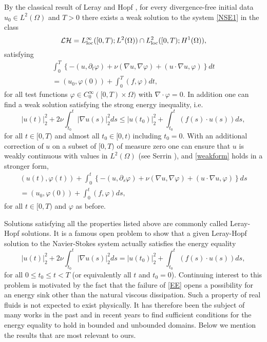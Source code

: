 \documentclass[12pt]{amsart}
\theoremstyle{plain}
\theoremstyle{definition}
\theoremstyle{remark}
\begin{document}
By the classical result of Leray \cite{Leray} and Hopf \cite{Hopf},
for every divergence-free initial data $u_0 \in L^2(\Omega)$ and
$T>0$ there exists a weak solution to the system \eqref{NSE1} in the
class
\begin{equation}
{\mathcal{LH}} = L^\infty_{\rm loc}([0,T);L^2(\Omega)) \cap L^2_{\rm loc}([0,T);H^1(\Omega)),
\end{equation}
satisfying
\begin{multline}\label{weakform}
 \int_0^T \left\{ - (u,{\partial}_t {\varphi}) + \nu ({\nabla} u,{\nabla} {\varphi}) + (u\cdot {\nabla} u, {\varphi}) \right\} dt\\ = (u_0,{\varphi}(0)) + \int_0^T (f,{\varphi})dt,
\end{multline}
for all test functions ${\varphi} \in C_0^\infty([0,T)\times \Omega)$ with ${\nabla} \cdot {\varphi} = 0$.
In addition one can find a weak solution satisfying the strong energy inequality, i.e.
\begin{equation}\label{SEI}
|u(t)|_2^2 + 2\nu \int_{t_0}^t |{\nabla} u(s)|_2^2 ds \leq |u(t_0)|_2^2 + \int_{t_0}^t (f(s) \cdot u(s)) ds,
\end{equation}
for all $t \in [0,T)$ and almost all $t_0 \in [0,t)$ including $t_0
= 0$. With an additional correction of $u$ on a subset of $[0,T)$ of
measure zero one can ensure that $u$ is weakly continuous with
values in $L^2(\Omega)$ (see Serrin \cite{Ser63}), and
\eqref{weakform} holds in a stronger form,
\begin{multline}\label{weakform2}
 (u(t),{\varphi}(t)) + \int_0^t \left\{ - (u,{\partial}_s {\varphi}) + \nu ({\nabla} u,{\nabla} {\varphi}) + (u\cdot {\nabla} u, {\varphi}) \right\} ds\\ = (u_0,{\varphi}(0)) + \int_0^t (f,{\varphi})ds,
\end{multline}
for all $t\in[0,T)$ and ${\varphi}$ as before.

Solutions satisfying all the properties
listed above are commonly called Leray-Hopf solutions. 
It is a famous open problem to show that
a given Leray-Hopf solution to the Navier-Stokes system actually satisfies the energy equality
\begin{equation}\label{EE}
|u(t)|_2^2 + 2\nu \int_{t_0}^t |{\nabla} u(s)|_2^2 ds = |u(t_0)|_2^2 + \int_{t_0}^t (f(s) \cdot u(s)) ds,
\end{equation}
for all $0\leq t_0 \leq t < T$ (or equivalently all $t$ and $t_0
= 0$). Continuing interest to this problem is motivated by the fact
that the failure of \eqref{EE} opens a possibility for an energy
sink other than the natural viscous dissipation. Such a property of
real fluids is not expected to exist physically. It has therefore
been the subject of many works in the past and in recent years to
find sufficient conditions for the energy equality to hold in
bounded and unbounded domains. Below we mention the results that are
most relevant to ours.
\end{document}
